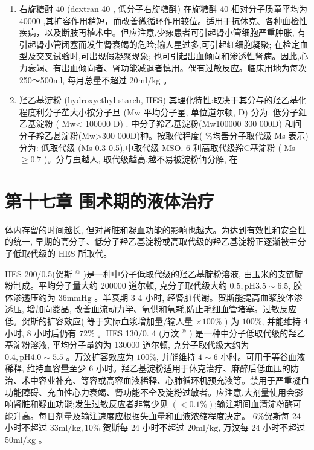 \documentclass[10pt]{article}
\begin{document}
\begin{enumerate}
  \item 右旋糖酎 40 (dextran 40 , 低分子右旋糖酙) 在旋糖酙 40 相对分子质童平均为 40000 ,其扩容作用稍短，而改善微循环作用较位。适用于抗休克、各种血检性疾病，以及断肢再植术中。但应注意,少㽷患者可引起肾小管细胞严重肿胀, 有引起肾小管闭塞而发生肾衰竭的危险;输人星过多,可引起红细胞凝聚; 在检定血型及交叉试验时,可出现假凝聚现象; 也可引起出血倾向和渗透性肾病。因此,心力衰竭、有出血倾向者、肾功能减退者慎用。偶有过敏反应。临床用地为每次 250～500ml, 每月总量不超过 $20 \mathrm{ml} / \mathrm{kg}$ 。

  \item 羟乙基淀粉 (hydroxyethyl starch, HES) 其理化特性:取决于其分与的羟乙基化程度利分子苼大小按分子旦 (Mw 平均分子星, 单位道尔顿, D) 分为: 低分子釭乙基淀粉 ( Mw< 100000 D) . 中分子羚乙基淀粉(Mw100000 300 000D) 和间分子羚乙甚淀粉(Mw>300 000D)种。按取代程度( \%均罟分子取代级 Ms 表示) 分为: 低取代级 (Ms 0.3 0.5),中取代级 MSO. 6 利高取代级羚C基淀粉 ( Ms $\geqslant 0.7$ )。分与虫越人, 取代级越高,越不易被淀粉侢分解, 在

\end{enumerate}

\section*{第十七章 围术期的液体治疗}
体内存留的时间越长, 但对肾脏和凝血功能的影响也越大。为达到有效性和安全性的统一, 早期的高分子、低分子羟乙基淀粉或高取代级的羟乙基淀粉正逐渐被中分子低取代级的 HES 所取代。

HES 200/0.5(贺斯 ${ }^{@}$ )是一种中分子低取代级的羟乙基腚粉溶液, 由玉米的支链腚粉制成。平均分子量大约 200000 道尔顿, 克分子取代级大约 $0.5, \mathrm{pH} 3.5 \sim 6.5$, 胶体渗透压约为 $36 \mathrm{mmHg}$ 。半衰期 3 4 小时, 经肾脏代谢。贺斯能提高血浆胶体渗透压, 增加向㚇品, 改善血流动力学、氧供和氧耗,防止毛细血管堵塞。过敏反应低。贺斯的扩容效应( 等于实际血浆增加量/输人量 $\times 100 \%$ ) 为 $100 \%$, 并能维持 4 小时, 8 小时后仍有 $72 \%$ 。HES 130/0. 4 (万汶 ${ }^{\circledR}$ ) 是一种中分子低取代级的羟乙基淀粉溶液, 平均分子量约为 130000 道尔顿, 克分子取代级大约为 $0.4, \mathrm{pH} 4.0 \sim 5.5$ 。万汶扩容效应为 $100 \%$, 并能维持 $4 \sim 6$ 小时。可用于等谷血液稀释, 维持血容量至少 6 小时。羟乙基淀粉适用于休克治疗、麻醉后低血压的防治、术中容业补充、等容或高容血液稀释、心肺循环机预充液等。禁用于严重凝血功能障碍、充血性心力衰竭、肾功能不全及淀粉过敏者。应注意,大剂量使用会影响肾脏和疑血功能;发生过敏反应者非常少见 $(<0.1 \%)$;输注期间血清淀粉酶可能升高。每日剂量及输注速度应根据失血量和血液浓缩程度决定。 $6 \%$贺斯每 24 小时不超过 $33 \mathrm{ml} / \mathrm{kg}, 10 \%$ 贺斯每 24 小时不超过 $20 \mathrm{ml} / \mathrm{kg}$, 万汶每 24 小时不超过 $50 \mathrm{ml} / \mathrm{kg}$ 。
\end{document}
